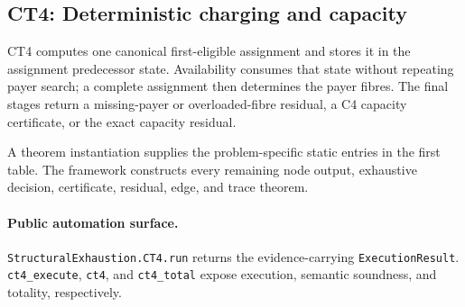 \subsection{CT4: Deterministic charging and capacity}
\label{sec:ct4-automation}

CT4 computes one canonical first-eligible assignment and stores it in the assignment predecessor state. Availability consumes that state without repeating payer search; a complete assignment then determines the payer fibres. The final stages return a missing-payer or overloaded-fibre residual, a C4 capacity certificate, or the exact capacity residual.

A theorem instantiation supplies the problem-specific static entries in the first table. The framework constructs every remaining node output, exhaustive decision, certificate, residual, edge, and trace theorem.

\paragraph{Public automation surface.}
\texttt{StructuralExhaustion.CT4.run} returns the evidence-carrying \texttt{ExecutionResult}. \texttt{ct4\_\allowbreak{}execute}, \texttt{ct4}, and \texttt{ct4\_\allowbreak{}total} expose execution, semantic soundness, and totality, respectively.

